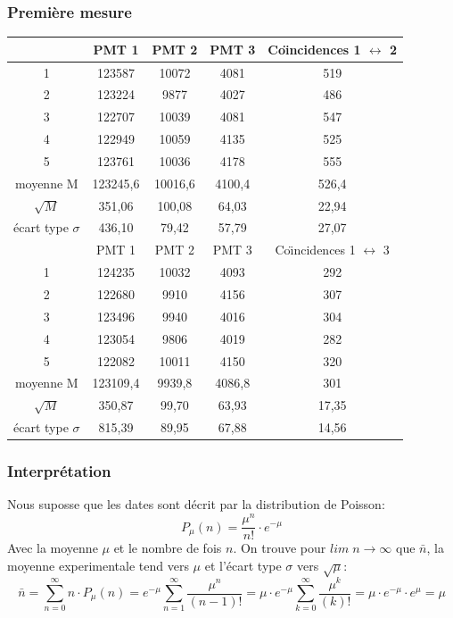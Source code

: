\documentclass[a4paper,11pt,liststotocnumbered,bibtotocnumbered]{scrartcl}
\begin{document}
   
   \subsubsection{Première mesure}

 \begin{tabular}{c|c|c|c|c}
   	&	PMT 1	&	PMT 2	&	PMT 3	&	Co\"{\i}ncidences 1 $\leftrightarrow$ 2	\\ \hline
1	&	123587	&	10072	&	4081	&	519	\\
2	&	123224	&	9877	&	4027	&	486	\\
3	&	122707	&	10039	&	4081	&	547	\\
4	&	122949	&	10059	&	4135	&	525	\\
5	&	123761	&	10036	&	4178	&	555	\\ \hline
moyenne M	&	123245,6	&	10016,6	&	4100,4	&	526,4	\\
$\sqrt M$	&	351,06	&	100,08	&	64,03	&	22,94	\\
écart type $\sigma$	&	436,10	&	79,42	&	57,79 &	27,07	\\ \hline
	&	PMT 1	&	PMT 2	&	PMT 3	&	Co\"{\i}ncidences 1 $\leftrightarrow$ 3	\\ \hline
1	&	124235	&	10032	&	4093	&	292	\\
2	&	122680	&	9910	&	4156	&	307	\\
3	&	123496	&	9940	&	4016	&	304	\\
4	&	123054	&	9806	&	4019	&	282	\\
5	&	122082	&	10011	&	4150	&	320	\\ \hline
moyenne M	&	123109,4	&	9939,8	&	4086,8	&	301	\\
$\sqrt M$	&	350,87	&	99,70	&	63,93	&	17,35	\\
écart type $\sigma$	&	815,39	&	89,95	&	67,88	&	14,56	\\
\end{tabular}

   \subsubsection{Interprétation} 
    Nous suposse que les dates sont décrit par la distribution de Poisson:
    \begin{equation*}
     P_{\mu}(n)=\frac{\mu^n}{n!}\cdot e^{-{\mu}}
    \end{equation*}
    Avec la moyenne $\mu$ et le nombre de fois $n$. On trouve pour $lim \; n {\rightarrow}  \infty$ que $\bar{n}$, la moyenne experimentale tend vers $\mu$ et l'écart type $\sigma$ vers $\sqrt{\mu}$:
    \begin{equation*}
     \bar{n}=\sum_{n=0}^{\infty} n \cdot P_{\mu}(n)=e^{-{\mu}}\sum_{n=1}^{\infty}\frac{\mu^n}{(n-1)!}=\mu \cdot  e^{-{\mu}}\sum_{k=0}^{\infty}\frac{\mu^k}{(k)!}=\mu \cdot e^{-{\mu}}\cdot  e^{{\mu}}=\mu
    \end{equation*}
\end{document}
